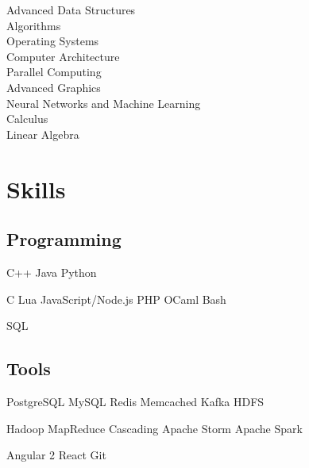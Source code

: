 \documentclass[]{resume}
\begin{document}
\begin{minipage}[t]{0.33\textwidth}
Advanced Data Structures \\
Algorithms \\
Operating Systems \\
Computer Architecture \\
Parallel Computing \\
Advanced Graphics \\
Neural Networks and Machine Learning \\
Calculus \\
Linear Algebra

\sectionsep


\section{Skills}

\subsection{Programming}

C++ \textbullet{} Java \textbullet{} Python

C \textbullet{} Lua \textbullet{} JavaScript/Node.js \textbullet{} PHP
\textbullet{} OCaml \textbullet{} Bash

SQL

\sectionsep

\subsection{Tools}

PostgreSQL \textbullet{} MySQL \textbullet{} Redis \textbullet{} Memcached
\textbullet{} Kafka \textbullet{} HDFS

Hadoop MapReduce \textbullet{} Cascading \textbullet{} Apache Storm
\textbullet{} Apache Spark

Angular 2 \textbullet{} React \textbullet{} Git

\sectionsep

%
%

\end{minipage}
\hfill
\end{document}
